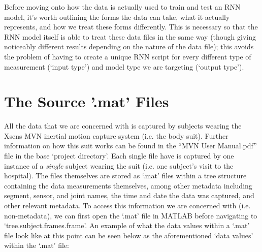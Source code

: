 \documentclass[12pt,twoside]{report}
\begin{document}
\quad Before moving onto how the data is actually used to train and test an RNN model, it’s worth outlining the forms the data can take, what it actually represents, and how we treat these forms differently. This is necessary so that the RNN model itself is able to treat these data files in the same way (though giving noticeably different results depending on the nature of the data file); this avoids the problem of having to create a unique RNN script for every different type of measurement (‘input type’) and model type we are targeting (‘output type’).

\section{The Source '.mat' Files}

\quad All the data that we are concerned with is captured by subjects wearing the Xsens MVN inertial motion capture system (i.e. the body suit). Further information on how this suit works can be found in the “MVN User Manual.pdf” file in the base ‘project directory’. Each single file have is captured by one instance of a \textit{single} subject wearing the suit (i.e. one subject’s visit to the hospital). The files themselves are stored as ‘.mat’ files within a tree structure containing the data measurements themselves, among other metadata including segment, sensor, and joint names, the time and date the data was captured, and other relevant metadata. To access this information we are concerned with (i.e. non-metadata), we can first open the ‘.mat’ file in MATLAB before navigating to ‘tree.subject.frames.frame’. An example of what the data values within a ‘.mat’ file look like at this point can be seen below as the aforementioned ‘data values’ within the ‘.mat’ file:
\end{document}
